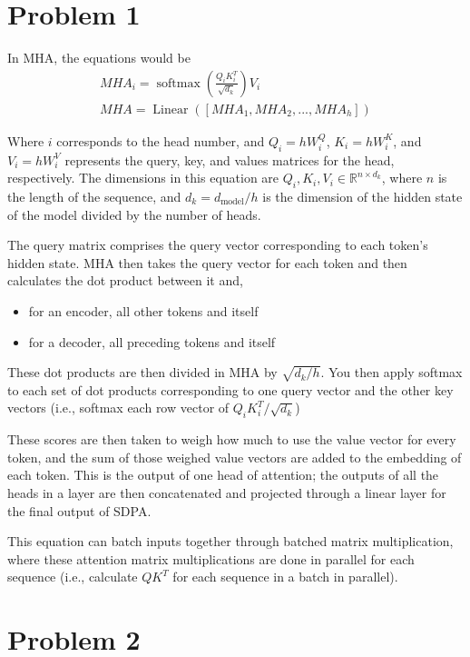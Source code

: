 \documentclass{article}
\DeclareMathOperator{\softmax}{softmax}
\DeclareMathOperator{\Linear}{{Linear}}
\begin{document}
\section*{Problem 1}

In MHA, the equations would be \begin{gather*}
    MHA_i = \softmax(\frac{Q_iK_i^T}{\sqrt{d_k}})V_i \\
    MHA = \Linear([MHA_1, MHA_2, ..., MHA_h])
\end{gather*}

Where $i$ corresponds to the head number, and $Q_i = hW^Q_i$, $K_i = hW^K_i$, and $V_i = hW^V_i$ represents the query, key, and values matrices for the head, respectively. The dimensions in this equation are $Q_i, K_i, V_i \in \mathbb{R}^{n \times d_k}$, where $n$ is the length of the sequence, and
$d_k = d_{\text{model}} / h$ is the dimension of the hidden state of the model divided by the number of heads.

The query matrix comprises the query vector corresponding to each token's hidden state. MHA then takes the query vector for each token and then calculates the dot product between it and,

\begin{itemize}
    \item for an encoder, all other tokens and itself
    \item for a decoder, all preceding tokens and itself
\end{itemize}

These dot products are then divided in MHA by $\sqrt{d_k / h}$. You then apply softmax to each set of dot products corresponding to one query vector and the other key vectors (i.e., softmax each row vector of $Q_iK_i^T / \sqrt{d_k}$)

These scores are then taken to weigh how much to use the value vector for every token, and the sum of those weighed value vectors are added to the embedding of each token. This is the output of one head of attention; the outputs of all the heads in a layer are then concatenated and projected through a linear layer for the final output of SDPA.

This equation can batch inputs together through batched matrix multiplication, where these attention matrix multiplications are done in parallel for each sequence (i.e., calculate $QK^T$ for each sequence in a batch in parallel).

\section*{Problem 2}
\end{document}

